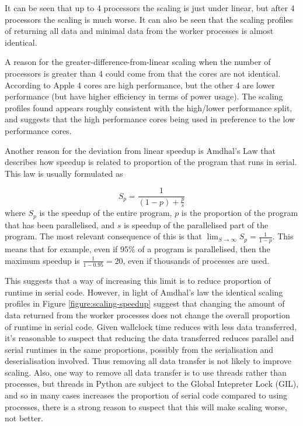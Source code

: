 \documentclass[logo,msc,dsti]{infthesis}    %
\begin{document}
It can be seen that up to 4 processors the scaling is just under linear, but after 4 processors the scaling is much worse. It can also be seen that the scaling profiles of returning all data and minimal data from the worker processes is almost identical.

A reason for the greater-difference-from-linear scaling when the number of processors is greater than 4 could come from that the cores are not identical. According to Apple \cite{AppleM1Overview} 4 cores are high performance, but the other 4 are lower performance (but have higher efficiency in terms of power usage). The scaling profiles found appears roughly consistent with the high/lower performance split, and suggests that the high performance cores being used in preference to the low performance cores.

Another reason for the deviation from linear speedup is Amdhal's Law that describes how speedup is related to proportion of the program that runs in serial. This law is usually formulated as

\begin{equation}
S_p = \frac{1}{(1-p) + \frac{p}{s}}
\end{equation}
%
where $S_p$ is the speedup of the entire program, $p$ is the proportion of the program that has been parallelised, and $s$ is speedup of the parallelised part of the program. The most relevant consequence of this is that $\lim_{S\to\infty} S_p = \frac{1}{1-p}$. This means that for example, even if 95\% of a program is parallelised, then the maximum speedup is $\frac{1}{1-0.95}=20$, even if thousands of processes are used.

This suggests that a way of increasing this limit is to reduce proportion of runtime in serial code. However, in light of Amdhal's law the identical scaling profiles in Figure \ref{figure:scaling-speedup} suggest that changing the amount of data returned from the worker processes does not change the overall proportion of runtime in serial code. Given wallclock time reduces with less data transferred, it's reasonable to suspect that reducing the data transferred reduces parallel and serial runtimes in the same proportions, possibly from the serialisation and deserialisation involved. Thus removing all data transfer is not likely to improve scaling. Also, one way to remove all data transfer is to use threads rather than processes, but threads in Python are subject to the Global Intepreter Lock (GIL), and so in many cases increases the proportion of serial code compared to using processes, there is a strong reason to suspect that this will make scaling worse, not better.
\end{document}
